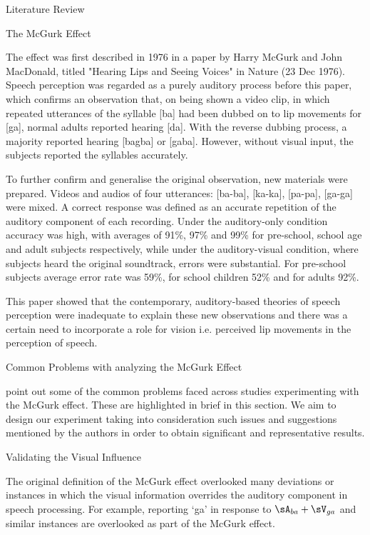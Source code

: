\documentclass{article}
\begin{document}
\begin{psection}{Literature Review}
	\begin{psubsection}{The McGurk Effect}

		The effect was first described in 1976 in a paper by Harry McGurk and John MacDonald, titled "Hearing Lips and Seeing Voices" \cite{original} in Nature (23 Dec 1976). Speech perception was regarded as a purely auditory process before this paper, which confirms an observation that, on being shown a video clip, in which repeated utterances of the syllable [ba] had been dubbed on to lip movements for [ga], normal adults reported hearing [da]. With the reverse dubbing process, a majority reported hearing [bagba] or [gaba].
		However, without visual input, the subjects reported the syllables accurately.

		To further confirm and generalise the original observation, new materials were prepared. Videos and audios of four utterances: [ba-ba], [ka-ka], [pa-pa], [ga-ga] were mixed. A correct response was defined as an accurate repetition of the auditory component of each recording. Under the auditory-only condition accuracy was high, with averages of 91\%, 97\% and 99\%  for pre-school, school age and adult subjects respectively, while under the auditory-visual condition, where subjects heard the original soundtrack, errors were substantial. For pre-school subjects average error rate was 59\%, for school children 52\% and for adults 92\%.

		This paper showed that the contemporary, auditory-based theories of speech perception were inadequate to explain these new observations and there was a certain need to incorporate a role for vision i.e. perceived lip movements in the perception of speech. 

	\end{psubsection}

	\begin{psubsection}{Common Problems with analyzing the McGurk Effect}

		\cite{40-years} point out some of the common problems faced across studies experimenting with the McGurk effect. These are highlighted in brief in this section. We aim to design our experiment taking into consideration such issues and suggestions mentioned by the authors in order to obtain significant and representative results.

		\begin{pssubsection}{Validating the Visual Influence}

			The original definition of the McGurk effect overlooked many deviations or instances in which the visual information overrides the auditory component in speech processing. For example, reporting `ga' in response to $\sA_{ba} + \sV_{ga}$ and similar instances are overlooked as part of the McGurk effect.


\end{pssubsection}
\end{psubsection}
\end{psection}
\end{document}
